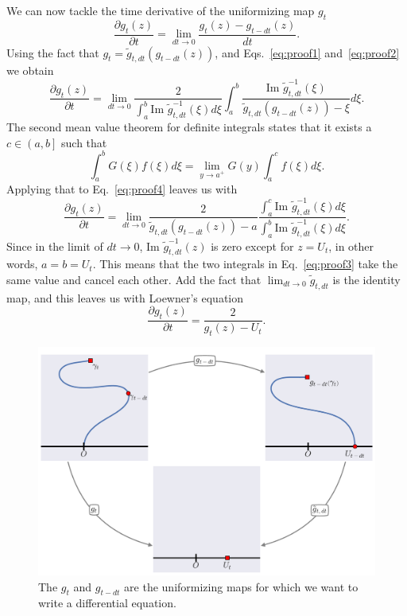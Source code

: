 We can now tackle the time derivative of the uniformizing map $g_t$
\begin{equation}
    \frac{\partial g_{t}\left(z\right)}{\partial t}=
    \lim_{dt\rightarrow0}\frac{g_{t}\left(z\right)-g_{t-dt}\left(z\right)}{dt}.
\end{equation}
Using the fact that $g_{t}=\tilde{g}_{t,dt}\left(g_{t-dt}\left(z\right)\right)$,
and Eqs.~\ref{eq:proof1} and~\ref{eq:proof2} we obtain
\begin{equation}
    \frac{\partial g_{t}\left(z\right)}{\partial t}=
    \lim_{dt\rightarrow0}\frac{2}
    {\int_{a}^{b}\mbox{Im }\tilde{g}_{t,dt}^{-1}\left(\xi\right)d\xi}
    \int_{a}^{b}
    \frac{\mbox{Im }\tilde{g}_{t,dt}^{-1}\left(\xi\right)}
    {\tilde{g}_{t,dt}\left(g_{t-dt}\left(z\right)\right)-\xi}d\xi.
    \label{eq:proof4}
\end{equation}
The second mean value theorem for definite integrals states that
it exists a $c\in\left(a,b\right]$ such that
\begin{equation}
    \int_{a}^{b}G\left(\xi\right)f\left(\xi\right)d\xi=
    \lim_{y\rightarrow a^+}G\left(y\right)\int_{a}^{c}f\left(\xi\right)d\xi.
\end{equation}
Applying that to Eq.~\ref{eq:proof4} leaves us with
\begin{equation}
    \label{eq:proof3}
     \frac{\partial g_{t}\left(z\right)}{\partial t}=
     \lim_{dt\rightarrow0}
     \frac{2}{\tilde{g}_{t,dt}\left(g_{t-dt}\left(z\right)\right)-a}
     \frac{\int_{a}^{c}\mbox{Im }\tilde{g}_{t,dt}^{-1}\left(\xi\right)d\xi}
          {\int_{a}^{b}\mbox{Im }\tilde{g}_{t,dt}^{-1}\left(\xi\right)d\xi}.
\end{equation}
Since in the limit of $dt\rightarrow0$, $\mbox{Im }\tilde{g}_{t,dt}^{-1}(z)$ is
zero except for $z=U_t$, in other words, $a=b=U_t$. This means that the two
integrals in Eq.~\ref{eq:proof3} take the same value and cancel each other. Add
the fact that $\lim_{dt\rightarrow 0}\tilde{g}_{t,dt}$ is the identity map, and
this leaves us with Loewner's equation
\begin{equation}
    \frac{\partial g_t(z)}{\partial t} = \frac{2}{g_t(z) - U_t}.
\end{equation}

\begin{figure}
\begin{center}
    \includegraphics[scale=0.4]{chapters/ch7-apdx/figs/proofscheme}
\end{center}
\caption{The $g_t$ and $g_{t-dt}$ are the uniformizing maps for which we
    want to write a differential equation.}
\label{fig:proofscheme}
\end{figure}
